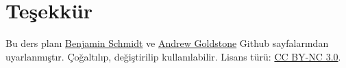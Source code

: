 \section{Teşekkür}\label{teux15fekkuxfcr}

Bu ders planı \href{https://github.com/bmschmidt/syllabus}{Benjamin
Schmidt} ve \href{https://github.com/agoldst/tex}{Andrew Goldstone}
Github sayfalarından uyarlanmıştır. Çoğaltılıp, değiştirilip
kullanılabilir. Lisans türü:
\href{http://creativecommons.org/licenses/by-nc/3.0/}{CC BY-NC 3.0}.

